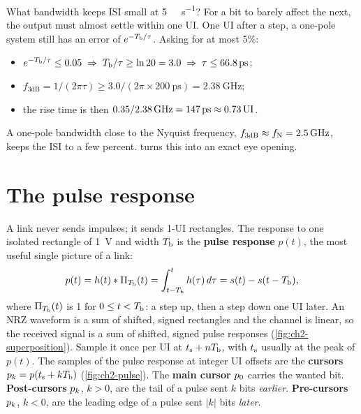 \begin{example}{What bandwidth keeps ISI small at \qty{5}{\giga\bit\per\second}?}\label{we:ch2-bw}
For a bit to barely affect the next, the output must almost settle within one UI. One UI after a step, a one-pole system still has an error of $e^{-T_\mathrm{b}/\tau}$. Asking for at most 5\%:
\begin{itemize}
  \item $e^{-\Tb/\tau} \le 0.05 \;\Rightarrow\; \Tb/\tau \ge \ln 20 = 3.0 \;\Rightarrow\; \tau \le \qty{66.8}{\pico\second}$;
  \item $f_\mathrm{3dB} = 1/(2\pi\tau) \ge 3.0/(2\pi\times\qty{200}{\pico\second}) = \qty{2.38}{\giga\hertz}$;
  \item the rise time is then $0.35/\qty{2.38}{\giga\hertz} = \qty{147}{\pico\second} \approx 0.73\,\UI$.
\end{itemize}
A one-pole bandwidth close to the Nyquist frequency, $f_\mathrm{3dB} \approx f_\mathrm{N} = \qty{2.5}{\giga\hertz}$, keeps the ISI to a few percent.  turns this into an exact eye opening.
\end{example}

\section{The pulse response}\label{sec:pulse-response}
A link never sends impulses; it sends 1-UI rectangles. The response to one isolated rectangle of \qty{1}{\volt} and width $T_\mathrm{b}$ is the \textbf{pulse response} $p(t)$, the most useful single picture of a link:
\begin{equation}
  p(t) = h(t) * \Pi_{T_\mathrm{b}}(t) = \int_{t-T_\mathrm{b}}^{t} h(\tau)\,d\tau = s(t) - s(t - T_\mathrm{b}),
  \label{eq:ch2-pulse}
\end{equation}
where $\Pi_{T_\mathrm{b}}(t)$ is 1 for $0 \le t < T_\mathrm{b}$: a step up, then a step down one UI later. An NRZ waveform is a sum of shifted, signed rectangles and the channel is linear, so the received signal is a sum of shifted, signed pulse responses (\cref{fig:ch2-superposition}). Sample it once per UI at $t_\mathrm{s} + nT_\mathrm{b}$, with $t_\mathrm{s}$ usually at the peak of $p(t)$. The samples of the pulse response at integer UI offsets are the \textbf{cursors} $p_{k} = p(t_\mathrm{s} + kT_\mathrm{b})$ (\cref{fig:ch2-pulse}). The \textbf{main cursor} $p_{0}$ carries the wanted bit. \textbf{Post-cursors} $p_{k}$, $k > 0$, are the tail of a pulse sent $k$ bits \emph{earlier}. \textbf{Pre-cursors} $p_{k}$, $k < 0$, are the leading edge of a pulse sent $\lvert k\rvert$ bits \emph{later}.

